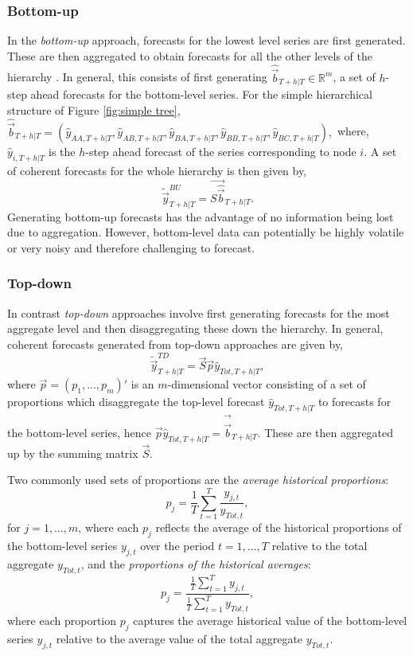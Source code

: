 \documentclass[graybox]{svmult}
\begin{document}
\subsubsection{Bottom-up}

In the \textit{bottom-up} approach, forecasts for the lowest level series are first generated. These are then aggregated to obtain forecasts for all the other levels of the hierarchy \citep{dunn1976}. In general, this consists of first generating $\hat{\vec{b}}_{T+h|T} \in \mathbb{R}^m$, a set of $h$-step ahead forecasts for the bottom-level series. For the simple hierarchical structure of Figure \ref{fig:simple tree}, $\hat{\vec{b}}_{T+h|T} = (\hat{{y}}_{AA,T+h|T}, \hat{{y}}_{AB,T+h|T}, \hat{{y}}_{BA,T+h|T}, \hat{{y}}_{BB,T+h|T},\hat{{y}}_{BC,T+h|T}),$ where, $\hat{{y}}_{i,T+h|T}$ is the $h$-step ahead forecast of the series corresponding to node $i$. A set of coherent forecasts for the whole hierarchy is then given by,
\begin{equation*}\label{eq:BU}
\tilde{\vec{y}}^{BU}_{T+h|T}=\vec{S\hat{\vec{b}}}_{T+h|T}.
\end{equation*}
Generating bottom-up forecasts has the advantage of no information being lost due to aggregation. However, bottom-level data can potentially be highly volatile or very noisy and therefore challenging to forecast.

\subsubsection{Top-down}

In contrast \textit{top-down} approaches involve first generating forecasts for the most aggregate level and then disaggregating these down the hierarchy. In general, coherent forecasts generated from top-down approaches are given by,
\begin{equation*}
\tilde{\vec{y}}^{TD}_{T+h|T}=\vec{S}\vec{p}\hat{y}_{Tot, T+h|T},
\end{equation*}
where $\vec{p} = (p_1,...,p_m)'$ is an $m$-dimensional vector consisting of a set of proportions which disaggregate the top-level forecast $\hat{y}_{Tot, T+h|T}$ to forecasts for the bottom-level series, hence $\vec{p}\hat{y}_{Tot, T+h|T}=\vec{\hat{\vec{b}}}_{T+h|T}$. These are then aggregated up by the summing matrix $\vec{S}$.

Two commonly used sets of proportions are the \textit{average historical proportions}:
\begin{equation*}
p_j = \frac{1}{T} \sum_{t=1}^{T}\frac{y_{j,t}}{y_{Tot,t}},
\end{equation*}
for $j=1,\ldots,m$, where each $p_j$ reflects the average of the historical proportions of the bottom-level series $y_{j,t}$ over the period $t=1,\ldots,T$ relative to the total aggregate $y_{Tot,t}$, and the \textit{proportions of the historical averages}:
\begin{equation}
p_j = \frac{\frac{1}{T}\sum_{t=1}^{T}y_{j,t}}{\frac{1}{T}\sum_{t=1}^{T}y_{Tot,t}},
\end{equation}
where each proportion $p_j$ captures the average historical value of the bottom-level series $y_{j,t}$ relative to the average value of the total aggregate $y_{Tot,t}$.
\end{document}

